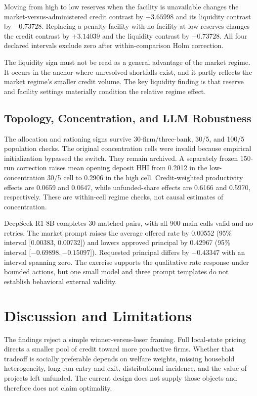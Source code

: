 \documentclass[11pt,a4paper]{article}
\begin{document}
Moving from high to low reserves when the facility is unavailable changes the market-versus-administered credit contrast by $+3.65998$ and its liquidity contrast by $-0.73728$. Replacing a penalty facility with no facility at low reserves changes the credit contrast by $+3.14039$ and the liquidity contrast by $-0.73728$. All four declared intervals exclude zero after within-comparison Holm correction.

The liquidity sign must not be read as a general advantage of the market regime. It occurs in the anchor where unresolved shortfalls exist, and it partly reflects the market regime's smaller credit volume. The key liquidity finding is that reserve and facility settings materially condition the relative regime effect.

\subsection{Topology, Concentration, and LLM Robustness}

The allocation and rationing signs survive 30-firm/three-bank, 30/5, and 100/5 population checks. The original concentration cells were invalid because empirical initialization bypassed the switch. They remain archived. A separately frozen 150-run correction raises mean opening deposit HHI from 0.2012 in the low-concentration 30/5 cell to 0.2906 in the high cell. Credit-weighted productivity effects are 0.0659 and 0.0647, while unfunded-share effects are 0.6166 and 0.5970, respectively. These are within-cell regime checks, not causal estimates of concentration.

DeepSeek R1 8B completes 30 matched pairs, with all 900 main calls valid and no retries. The market prompt raises the average offered rate by 0.00552 (95\% interval [0.00383, 0.00732]) and lowers approved principal by 0.42967 (95\% interval [$-0.69898, -0.15097$]). Requested principal differs by $-0.43347$ with an interval spanning zero. The exercise supports the qualitative rate response under bounded actions, but one small model and three prompt templates do not establish behavioral external validity.

\section{Discussion and Limitations}

The findings reject a simple winner-versus-loser framing. Full local-state pricing directs a smaller pool of credit toward more productive firms. Whether that tradeoff is socially preferable depends on welfare weights, missing household heterogeneity, long-run entry and exit, distributional incidence, and the value of projects left unfunded. The current design does not supply those objects and therefore does not claim optimality.
\end{document}
